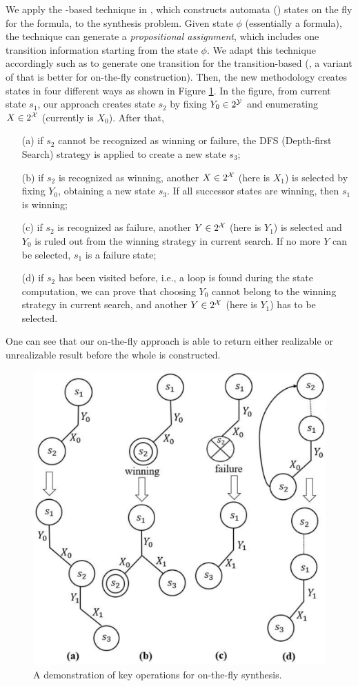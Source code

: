 We apply the \SAT-based technique in \cite{LRPZV19}, which constructs automata (\NFA) states on the fly for the \ltlf formula, to the synthesis problem. Given state $\phi$ (essentially a formula), the technique can generate a \emph{propositional assignment}, which includes one transition information starting from the state $\phi$. We adapt this technique accordingly such as to generate one transition for the transition-based \DFA (\tdfa, a variant of \dfa that is better for on-the-fly construction). Then, the new methodology creates \tdfa states in four different ways as shown in Figure \ref{fig:demonstration}. In the figure, from current state $s_1$, our approach creates state $s_2$ by fixing $Y_0\in 2^{\mathcal{Y}}$ and enumerating $X\in 2^{\mathcal{X}}$ (currently is $X_0$). After that,
\begin{itemize}
    \item[(a)]  if $s_2$ cannot be recognized as winning or failure, the DFS (Depth-first Search) strategy is applied to create a new state $s_3$;
    \item[(b)] if $s_2$ is recognized as winning, another $X\in 2^{\mathcal{X}}$ (here is $X_1$) is selected by fixing $Y_0$, obtaining a new state $s_3$. If all successor states are winning, then $s_1$ is winning;
    \item[(c)] if $s_2$ is recognized as failure, another $Y\in 2^{\mathcal{X}}$ (here is $Y_1$) is selected and $Y_0$ is ruled out from the winning strategy in current search. If no more $Y$ can be selected, $s_1$ is a failure state;
    \item[(d)] if $s_2$ has been visited before, i.e., a loop is found during the state computation, we can prove that choosing $Y_0$ cannot belong to the winning strategy in current search, and another $Y\in 2^{\mathcal{X}}$ (here is $Y_1$) has to be selected. 
\end{itemize}

One can see that our on-the-fly approach is able to return either realizable or unrealizable result before the whole \dfa is constructed. 

\begin{figure}
    \centering
    \includegraphics[scale=0.35]{demonstration.pdf}
    \caption{A demonstration of key operations for on-the-fly \ltlf synthesis.}
    \label{fig:demonstration}
\end{figure}



